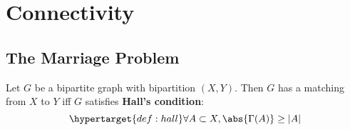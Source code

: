 \documentclass{article}
\begin{document}
\section{Connectivity}
\subsection{The Marriage Problem}















\begin{nthm}\label{thm:31}
    Let $G$ be a bipartite graph with bipartition $(X,Y)$.
    Then $G$ has a matching from $X$ to $Y$ iff $G$ satisfies \textbf{Hall's condition}:
    \begin{equation*}
        \hypertarget{def:hall}\forall A \subset X, \abs{\Gamma(A)} \geq |A|
    \end{equation*}
\end{nthm}
\end{document}
